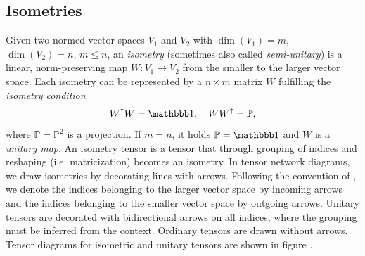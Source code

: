 \subsection*{Isometries}
Given two normed vector spaces $V_1$ and $V_2$ with $\dim\left(V_1\right) = m$, $\dim\left(V_2\right) = n$, $m \le n$, an \textit{isometry} (sometimes also called \textit{semi-unitary}) is a linear, norm-preserving map $W: V_1 \rightarrow V_2$ from the smaller to the larger vector space. Each isometry can be represented by a $n\times m$ matrix $W$ fulfilling the \textit{isometry condition}
\begin{equation}
	\label{eq:isometry_condition_general}
	W^\dagger W = \id, \quad WW^\dagger = \mathbb{P},
\end{equation}
where $\mathbb{P} = \mathbb{P}^2$ is a projection. If $m = n$, it holds $\mathbb{P} = \id$ and $W$ is a \textit{unitary map}. An isometry tensor is a tensor that through grouping of indices and reshaping (i.e. matricization) becomes an isometry. In tensor network diagrams, we draw isometries by decorating lines with arrows. Following the convention of \cite{cite:isometric_tensor_network_states_in_two_dimensions, cite:efficient_simulation_of_dynamics_in_two_dimensional_quantum_spin_systems}, we denote the indices belonging to the larger vector space by incoming arrows and the indices belonging to the smaller vector space by outgoing arrows. Unitary tensors are decorated with bidirectional arrows on all indices, where the grouping must be inferred from the context. Ordinary tensors are drawn without arrows. Tensor diagrams for isometric and unitary tensors are shown in figure .\par
